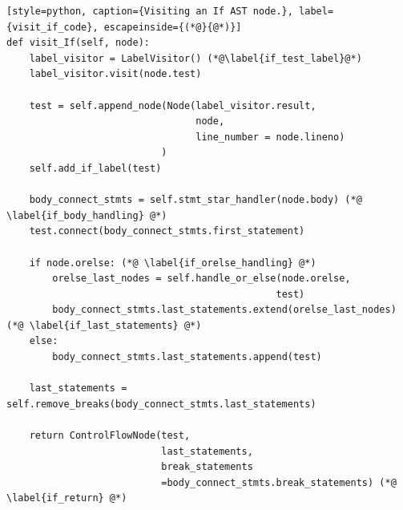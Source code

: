 \begin{lstlisting}[style=python, caption={Visiting an If AST node.}, label={visit_if_code}, escapeinside={(*@}{@*)}]
def visit_If(self, node):
    label_visitor = LabelVisitor() (*@\label{if_test_label}@*)
    label_visitor.visit(node.test)

    test = self.append_node(Node(label_visitor.result,
                                 node,
                                 line_number = node.lineno)
                           )
    self.add_if_label(test)

    body_connect_stmts = self.stmt_star_handler(node.body) (*@ \label{if_body_handling} @*)
    test.connect(body_connect_stmts.first_statement)
        
    if node.orelse: (*@ \label{if_orelse_handling} @*)
        orelse_last_nodes = self.handle_or_else(node.orelse,
                                               test)
        body_connect_stmts.last_statements.extend(orelse_last_nodes) (*@ \label{if_last_statements} @*)
    else:
        body_connect_stmts.last_statements.append(test)

    last_statements = self.remove_breaks(body_connect_stmts.last_statements)

    return ControlFlowNode(test,
                           last_statements,
                           break_statements
                           =body_connect_stmts.break_statements) (*@ \label{if_return} @*)
\end{lstlisting}
